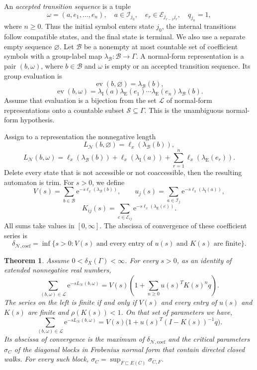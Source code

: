 \documentclass[11pt]{article}
\newtheorem{theorem}{Theorem}[section]
\theoremstyle{definition}
\newcommand{\coef}{\mathrm{coef}}
\newcommand{\e}{\mathrm e}
\begin{document}
An \emph{accepted transition sequence} is a tuple
\[
 \omega=(a,e_1,\ldots,e_n),
 \quad
 a\in\mathcal I_{j_0},\quad
 e_r\in\mathcal E_{j_{r-1}j_r},\quad q_{j_n}=1,
\]
where $n\ge0$.  Thus the initial symbol enters state $j_0$, the internal transitions follow
compatible states, and the final state is terminal.  We also use a separate empty sequence
$\varnothing$.  Let $\mathcal B$ be a nonempty at most countable set of coefficient symbols
with a group-label map $\lambda_{\mathcal B}:\mathcal B\to\Gamma$.  A normal-form
representation is a pair $(b,\omega)$, where $b\in\mathcal B$ and $\omega$ is empty or an
accepted transition sequence.  Its group evaluation is
\[
 \operatorname{ev}(b,\varnothing)=\lambda_{\mathcal B}(b),
\]
\[
 \operatorname{ev}(b,\omega)=
 \lambda_{\mathrm I}(a)\lambda_{\mathrm E}(e_1)\cdots
 \lambda_{\mathrm E}(e_n)\lambda_{\mathcal B}(b).
\]
Assume that evaluation is a bijection from the set $\mathcal L$ of normal-form
representations onto a countable subset $\mathscr S\subseteq\Gamma$.  This is the
unambiguous normal-form hypothesis.

Assign to a representation the nonnegative length
\[
 L_{\mathcal N}(b,\varnothing)=\ell_x(\lambda_{\mathcal B}(b)),
\]
\[
 L_{\mathcal N}(b,\omega)=
 \ell_x(\lambda_{\mathcal B}(b))+
 \ell_x(\lambda_{\mathrm I}(a))+
 \sum_{r=1}^n\ell_x(\lambda_{\mathrm E}(e_r)).
\]
Delete every state that is not accessible or not coaccessible, then the resulting automaton is
trim.  For $s>0$,  we define
\begin{equation}\label{eq:abstract-coefficients}
 V(s)=\sum_{b\in\mathcal B}\e^{-s\ell_x(\lambda_{\mathcal B}(b))},
 \qquad
 u_j(s)=\sum_{a\in\mathcal I_j}\e^{-s\ell_x(\lambda_{\mathrm I}(a))},
\end{equation}
\[
 K_{ij}(s)=\sum_{e\in\mathcal E_{ij}}
 \e^{-s\ell_x(\lambda_{\mathrm E}(e))}.
\]
All sums take values in $[0,\infty]$.  The abscissa of convergence of these coefficient series is
\[
 \delta_{\mathcal N,\coef}=
 \inf\{s>0:V(s)\text{ and every entry of }u(s)\text{ and }K(s)\text{ are finite}\}.
\]

\begin{theorem}
\label{thm:normal-form-resolvent}
Assume $0<\delta_X(\Gamma)<\infty$.  For every $s>0$, as an identity of extended
nonnegative real numbers,
\begin{equation}\label{eq:abstract-resolvent-expanded}
 \sum_{(b,\omega)\in\mathcal L}\e^{-sL_{\mathcal N}(b,\omega)}
 =V(s)\left(1+\sum_{n\ge0}u(s)^TK(s)^nq\right).
\end{equation}
The series on the left is finite if and only if $V(s)$ and every entry of $u(s)$ and $K(s)$
are finite and $\rho(K(s))<1$.  On that set of parameters we have,
\begin{equation}\label{eq:abstract-resolvent}
 \sum_{(b,\omega)\in\mathcal L}\e^{-sL_{\mathcal N}(b,\omega)}
 =V(s)\bigl(1+u(s)^T(I-K(s))^{-1}q\bigr).
\end{equation}
Its abscissa of convergence is the maximum of $\delta_{\mathcal N,\coef}$ and the
critical parameters $\sigma_C$ of the diagonal blocks in Frobenius normal form that contain
directed closed walks.  For every such block,
$\sigma_C=\sup_{F\sqsubset E(C)}\sigma_{C,F}$.
\end{theorem}
\end{document}
